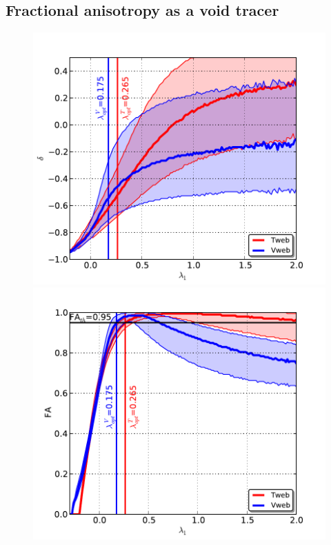 \documentclass[a4,useAMS,usenatbib,usegraphicx]{mn2e}
\begin{document}
\subsection{Fractional anisotropy as a void tracer}
\label{subsec:web_voids}


\begin{figure}
\centering

  \includegraphics[trim = 2mm 2mm 5mm 10mm, clip, keepaspectratio=true,
  width=0.3\textheight]{delta_L1.pdf}  
  \includegraphics[trim = 2mm 2mm 5mm 10mm, clip, keepaspectratio=true,
  width=0.3\textheight]{FA_L1.pdf}


\end{figure}
\end{document}

